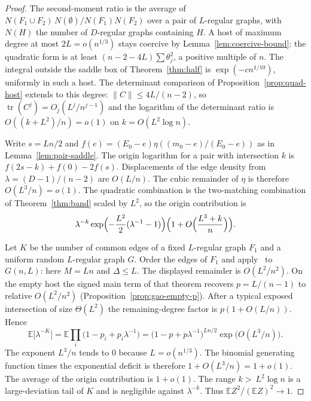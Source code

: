 \documentclass[11pt]{article}
\newcommand{\EE}{\mathbb{E}}
\begin{document}
\begin{proof}
The second-moment ratio is the average of \(N(F_1\cup F_2)\,N(\emptyset)/N(F_1)N(F_2)\) over a pair of \(L\)-regular graphs, with \(N(H)\) the number of \(D\)-regular graphs containing \(H\).
A host of maximum degree at most \(2L=o(n^{1/3})\) stays coercive by Lemma~\ref{lem:coercive-bound}: the quadratic form is at least \((n-2-4L)\sum\theta_j^2\), a positive multiple of \(n\).
The integral outside the saddle box of Theorem~\ref{thm:half} is \(\exp(-c n^{1/10})\), uniformly in such a host.
The determinant comparison of Proposition~\ref{prop:quad-host} extends to this degree: \(\|C\|\le 4L/(n-2)\), so \(\operatorname{tr}(C^j)=O_j(L^j/n^{j-1})\) and the logarithm of the determinant ratio is \(O((k+L^2)/n)=o(1)\) on \(k=O(L^2\log n)\).

Write \(s=Ln/2\) and \(f(e)=(E_0-e)\eta((m_0-e)/(E_0-e))\) as in Lemma~\ref{lem:pair-saddle}.
The origin logarithm for a pair with intersection \(k\) is \(f(2s-k)+f(0)-2f(s)\).
Displacements of the edge density from \(\lambda=(D-1)/(n-2)\) are \(O(L/n)\).
The cubic remainder of \(\eta\) is therefore \(O(L^3/n)=o(1)\).
The quadratic combination is the two-matching combination of Theorem~\ref{thm:band} scaled by \(L^2\), so the origin contribution is
\[
\lambda^{-k}\exp\Bigl(-\frac{L^2}{2}(\lambda^{-1}-1)\Bigr)\Bigl(1+O\Bigl(\frac{L^3+k}{n}\Bigr)\Bigr).
\]

Let \(K\) be the number of common edges of a fixed \(L\)-regular graph \(F_1\) and a uniform random \(L\)-regular graph \(G\).
Order the edges of \(F_1\) and apply~\cite[Theorem~6]{Gao20} to \(G(n,L)\): here \(M=Ln\) and \(\Delta\le L\).
The displayed remainder is \(O(L^2/n^2)\).
On the empty host the signed main term of that theorem recovers \(p=L/(n-1)\) to relative \(O(L^2/n^2)\) (Proposition~\ref{prop:gao-empty-p}).
After a typical exposed intersection of size \(\Theta(L^2)\) the remaining-degree factor is \(p(1+O(L/n))\).
Hence
\[
\EE\bigl[\lambda^{-K}\bigr]
=
\EE\prod_i\bigl(1-p_i+p_i\lambda^{-1}\bigr)
=
\bigl(1-p+p\lambda^{-1}\bigr)^{Ln/2}\exp\bigl(O(L^3/n)\bigr).
\]
The exponent \(L^3/n\) tends to \(0\) because \(L=o(n^{1/3})\).
The binomial generating function times the exponential deficit is therefore \(1+O(L^3/n)=1+o(1)\).
The average of the origin contribution is \(1+o(1)\).
The range \(k>\ L^2\log n\) is a large-deviation tail of \(K\) and is negligible against \(\lambda^{-k}\).
Thus \(\EE Z^2/(\EE Z)^2\to 1\).
\end{proof}
\end{document}
